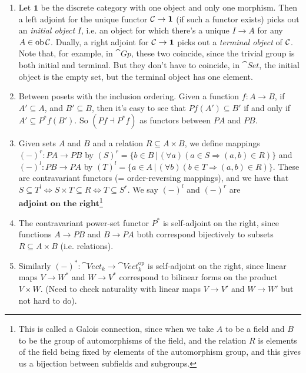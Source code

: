 \documentclass{article}
\begin{document}
\begin{exs}
\begin{enumerate}
        \item[(f)] Let $\mathbf{1}$ be the discrete category with one object and only one morphism. Then a left adjoint for the unique functor $\mathcal{C} \to \mathbf{1}$ (if such a functor exists) picks out an \textit{initial object} $I$, i.e. an object for which there's a unique $I \to A$ for any $A \in \operatorname{ob} \mathcal{C}$. Dually, a right adjoint for $\mathcal{C} \to \mathbf{1}$ picks out a \textit{terminal object} of $\mathcal{C}$. Note that, for example, in $\cat{Gp}$, these two coincide, since the trivial group is both initial and terminal. But they don't have to coincide, in $\cat{Set}$, the initial object is the empty set, but the terminal object has one element.
        \item[(g)] Between posets with the inclusion ordering. Given a function $f: A \to B$, if $A' \subseteq A$, and $B' \subseteq B$, then it's easy to see that $Pf(A') \subseteq B'$ if and only if $A' \subseteq P^{*}f(B')$. So $(Pf \dashv P^{*}f)$ as functors between $PA$ and $PB$.
        \item[(h)] Given sets $A$ and $B$ and a relation $R \subseteq A \times B$, we define mappings $ (-)^{r} : PA \to PB$ by $(S)^{r} = \{ b \in B \, | \, (\forall a)(a \in S \Rightarrow (a,b) \in R) \}$ and $(-)^{l} : PB \to PA$ by $(T)^{l}=\{ a \in A \, | \, (\forall b)(b \in T \Rightarrow (a,b) \in R)\}$. These are contravariant functors (= order-reversing mappings), and we have that $S \subseteq T^{l} \Leftrightarrow S \times T \subseteq R \Leftrightarrow T \subseteq S^{r}$. We say $(-)^{l}$ and $(-)^{r}$ are $\textbf{adjoint on the right}$\footnote{This is called a Galois connection, since when we take $A$ to be a field and $B$ to be the group of automorphisms of the field, and the relation $R$ is elements of the field being fixed by elements of the automorphism group, and this gives us a bijection between subfields and subgroups.}
        \item[(i)] The contravariant power-set functor $P^{*}$ is self-adjoint on the right, since functions $A \to PB$ and $B \to PA$ both correspond bijectively to subsets $R \subseteq A \times B$ (i.e. relations).
        \item[(j)] Similarly $(-)^{*} : \cat{Vect}_{k} \to \cat{Vect}_{k}^{\text{op}}$ is self-adjoint on the right, since linear maps $V \to W^{*}$ and $W \to V^{*}$ correspond to bilinear forms on the product $V \times W$. (Need to check naturality with linear maps $V \to V'$ and $W \to W'$ but not hard to do).
    \end{enumerate}
\end{exs}
\end{document}
